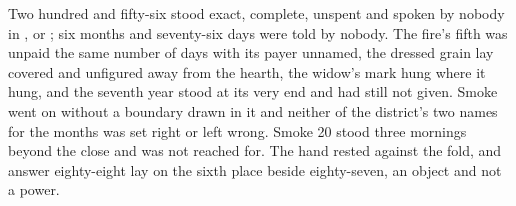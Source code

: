 Two hundred and fifty-six stood exact, complete, unspent and spoken by nobody in ,  or ; six months and seventy-six days were told by nobody. The fire's fifth was unpaid the same number of days with its payer unnamed, the dressed grain lay covered and unfigured away from the hearth, the widow's mark hung where it hung, and the seventh year stood at its very end and had still not given. Smoke went on without a boundary drawn in it and neither of the district's two names for the months was set right or left wrong. Smoke 20 stood three mornings beyond the close and was not reached for. The hand rested against the fold, and answer eighty-eight lay on the sixth place beside eighty-seven, an object and not a power.
